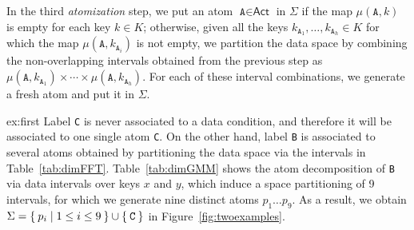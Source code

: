 In the third \textit{atomization} step, we put an atom $\texttt{A}\in\textsf{Act}$ in $\Sigma$ if the map $\mu(\texttt{A},k)$ is empty for each key $k\in K$; otherwise, given all the keys $k_{\texttt{A}_1},\dots,k_{\texttt{A}_h}\in K$ for which the map $\mu(\texttt{A},k_{\texttt{A}_i})$ is not empty, we partition the data space by combining the non-overlapping intervals obtained from the previous step as $\mu(\texttt{A},k_{\texttt{A}_1})\times\cdots\times\mu(\texttt{A},k_{\texttt{A}_h})$. For each of these interval combinations, we generate a fresh atom and put it in $\Sigma$.
\begin{continueexample}{ex:first}
Label \texttt{C} is never associated to a data condition, and therefore it will be associated to one single atom \texttt{C}. On the other hand, label \texttt{B} is associated to several atoms obtained by partitioning the data space via the intervals in Table~\ref{tab:dimFFT}. Table~\ref{tab:dimGMM} shows the atom decomposition of \texttt{B} via data intervals over keys $x$ and $y$, which induce a space partitioning of 9 intervals, for which we generate nine distinct atoms $p_1\dots p_9$. As a result, we obtain $\Sigma=\Set{p_i|1\leq i\leq 9}\cup\Set{\texttt{C}}$ in Figure~\ref{fig:twoexamples}.
\end{continueexample}




